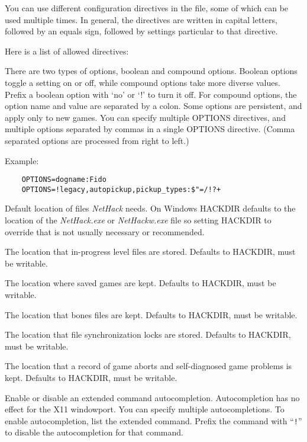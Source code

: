 You can use different configuration directives in the file, some
of which can be used multiple times.
In general, the directives are
written in capital letters, followed by an equals sign, followed by
settings particular to that directive.

Here is a list of allowed directives:

\blist{}
\item[\bb{OPTIONS}]
There are two types of options, boolean and compound options.
Boolean options toggle a setting on or off, while compound options
take more diverse values.
Prefix a boolean option with `no' or `!' to turn it off.
For compound options, the option name and value are separated by a colon.
Some options are persistent, and apply only to new games.
You can specify multiple OPTIONS directives, and multiple options
separated by commas in a single OPTIONS directive.
(Comma separated options are processed from right to left.)

Example:
\begin{verbatim}
    OPTIONS=dogname:Fido
    OPTIONS=!legacy,autopickup,pickup_types:$"=/!?+
\end{verbatim}

\item[\bb{HACKDIR}]
Default location of files {\it NetHack\/} needs. On Windows HACKDIR
defaults to the location of the {\it NetHack.exe\/} or {\it NetHackw.exe\/} file
so setting HACKDIR to override that is not usually necessary or recommended.
\item[\bb{LEVELDIR}]
The location that in-progress level files are stored. Defaults to HACKDIR,
must be writable.
\item[\bb{SAVEDIR}]
The location where saved games are kept. Defaults to HACKDIR, must be
writable.
\item[\bb{BONESDIR}]
The location that bones files are kept. Defaults to HACKDIR, must be
writable.
\item[\bb{LOCKDIR}]
The location that file synchronization locks are stored. Defaults to
HACKDIR, must be writable.
\item[\bb{TROUBLEDIR}]
The location that a record of game aborts and self-diagnosed game problems
is kept. Defaults to HACKDIR, must be writable.
%
%
\item[\bb{AUTOCOMPLETE}]
Enable or disable an extended command autocompletion.
Autocompletion has no effect for the X11 windowport.
You can specify multiple autocompletions. To enable
autocompletion, list the extended command. Prefix the
command with ``{{\tt !}}'' to disable the autocompletion
for that command.

